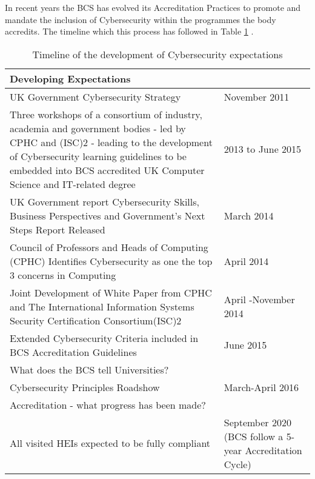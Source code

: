 \documentclass[sigconf,anonymous]{acmart}
\begin{document}
In recent years the BCS has evolved its Accreditation Practices to promote and mandate the inclusion of Cybersecurity within the programmes the body accredits. The timeline which this process has followed in Table \ref{table:1} .
\begin{center}
  \begin{table}[h!]
  \begin{tabular}{ | p{6cm} |p{1.5cm} |}
    \hline
    Developing Expectations &   \\ \hline
    UK Government Cybersecurity Strategy \cite{UKCabinetOffice} & November 2011 \\ \hline
    Three workshops of a consortium of industry, academia and government bodies - led by CPHC and (ISC)2 - leading to the development of Cybersecurity learning guidelines to be embedded into BCS accredited UK Computer Science and IT-related degree \cite{CPHCISC2}  & 2013 to June 2015 \\ \hline
    UK Government report Cybersecurity Skills, Business Perspectives and Government's Next Steps Report Released \cite{UKCabinetOffice2014} & March 2014  \\ \hline
    Council of Professors and Heads of Computing (CPHC) Identifies Cybersecurity as one the top 3 concerns in Computing & April 2014 \\ \hline
    Joint Development of White Paper from CPHC and The International Information Systems Security Certification Consortium(ISC)2 \cite{CPHCISC2014} & April -November 2014 \\ \hline
    Extended Cybersecurity Criteria included in BCS Accreditation Guidelines \cite{BCS2018a}& June 2015 \\
    \hline
    What does the BCS tell Universities? & \\ \hline
    Cybersecurity Principles Roadshow & March-April 2016 \\ \hline
    Accreditation - what progress has been made? &  \\ \hline
    All visited HEIs expected to be fully compliant & September 2020 (BCS follow a 5-year Accreditation Cycle)  \\ \hline
  \end{tabular}
  \caption{Timeline of the development of Cybersecurity expectations}
  \label{table:1}
  \end{table}
\end{center}
\end{document}
